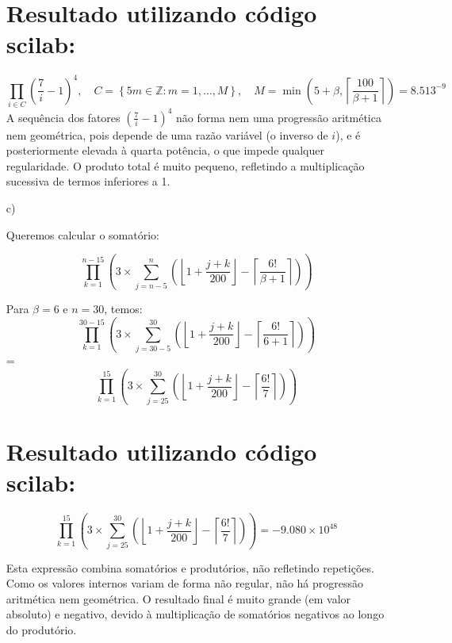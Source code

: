 \begin{enumerate}
\section*{Resultado utilizando  código scilab:}

\[
\prod_{i \in C} \left( \frac{7}{i } -1 \right)^4, \quad C = \left\{ 5m \in \mathbb{Z}: m = 1, \dots, M \right\}, \quad M = \min \left( 5 + \beta, \left\lceil \frac{100}{\beta + 1} \right\rceil \right) = 8.513^{-9}
\]
\newline
A sequência dos fatores \(\left( \frac{7}{i} - 1 \right)^4\) não forma nem uma progressão aritmética nem geométrica, pois depende de uma razão variável (o inverso de $i$), e é posteriormente elevada à quarta potência, o que impede qualquer regularidade. O produto total é muito pequeno, refletindo a multiplicação sucessiva de termos inferiores a 1.

 \vspace{2em}
      \item[c)]

    Queremos calcular o somatório:

      \[
\prod_{k=1}^{n-15} \left( 3 \times \sum_{j=n-5}^{n} \left( \left\lfloor 1 + \frac{j + k}{200} \right\rfloor - \left\lceil \frac{6!}{\beta + 1} \right\rceil \right) \right)
\]

    Para \(\beta = 6\) e \(n = 30\), temos:
  \[
\prod_{k=1}^{30-15} \left( 3 \times \sum_{j=30-5}^{30} \left( \left\lfloor 1 + \frac{j + k}{200} \right\rfloor - \left\lceil \frac{6!}{6 + 1} \right\rceil \right) \right)
\]
 = \[
\prod_{k=1}^{15} \left( 3 \times \sum_{j=25}^{30} \left( \left\lfloor 1 + \frac{j + k}{200} \right\rfloor - \left\lceil \frac{6!}{7} \right\rceil \right) \right)
\]

\section*{Resultado utilizando  código scilab:}
\[
\prod_{k=1}^{15} \left( 3 \times \sum_{j=25}^{30} \left( \left\lfloor 1 + \frac{j + k}{200} \right\rfloor - \left\lceil \frac{6!}{7} \right\rceil \right) \right) = -9.080 \times 10^{48}
\] 

Esta expressão combina somatórios e produtórios, não refletindo repetições. Como os valores internos variam de forma não regular, não há progressão aritmética nem geométrica. O resultado final é muito grande (em valor absoluto) e negativo, devido à multiplicação de somatórios negativos ao longo do produtório.

\end{enumerate}


